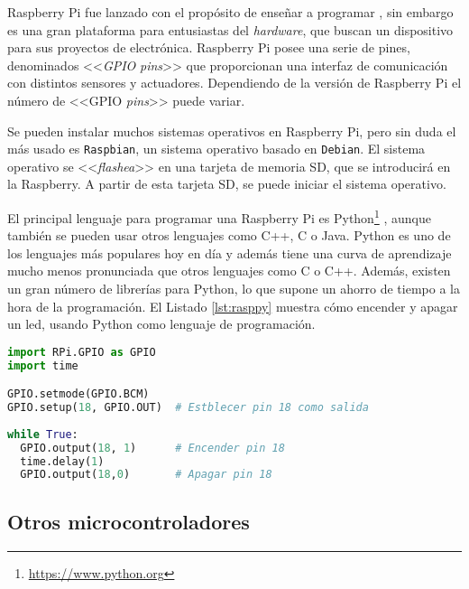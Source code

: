 Raspberry Pi fue lanzado con el propósito de enseñar a programar \cite{21}, sin embargo es una gran plataforma para entusiastas del \textit{hardware}, que buscan un dispositivo para sus proyectos de electrónica. Raspberry Pi posee una serie de pines, denominados <<\textit{\ac{GPIO}} \textit{pins}>> que proporcionan una interfaz de comunicación con distintos sensores y actuadores. Dependiendo de la versión de Raspberry Pi el número de <<\ac{GPIO} \textit{pins}>> puede variar. 

Se pueden instalar muchos sistemas operativos en Raspberry Pi, pero sin duda el más usado es \texttt{Raspbian}, un sistema operativo basado en \texttt{Debian}. El sistema operativo se <<\textit{flashea}>> en una tarjeta de memoria \ac{SD}, que se introducirá en la Raspberry. A partir de esta tarjeta \ac{SD}, se puede iniciar el sistema operativo.

El principal lenguaje para programar una Raspberry Pi es Python\footnote{\url{https://www.python.org}} \cite{20}, aunque también se pueden usar otros lenguajes como C++, C o Java. Python es uno de los lenguajes más populares hoy en día y además tiene una curva de aprendizaje mucho menos pronunciada que otros lenguajes como C o C++. Además, existen un gran número de librerías para Python, lo que supone un ahorro de tiempo a la hora de la programación. El Listado \ref{lst:rasppy} muestra cómo encender y apagar un led, usando Python como lenguaje de programación.

\begin{lstlisting}[language=python,captionpos=t,caption={\textbf{Encender y apagar un led en Raspberry.}},label={lst:rasppy}]
import RPi.GPIO as GPIO
import time

GPIO.setmode(GPIO.BCM)
GPIO.setup(18, GPIO.OUT)  # Estblecer pin 18 como salida
 
while True:
  GPIO.output(18, 1)      # Encender pin 18
  time.delay(1)       
  GPIO.output(18,0)       # Apagar pin 18
\end{lstlisting}

\subsection{Otros microcontroladores}

